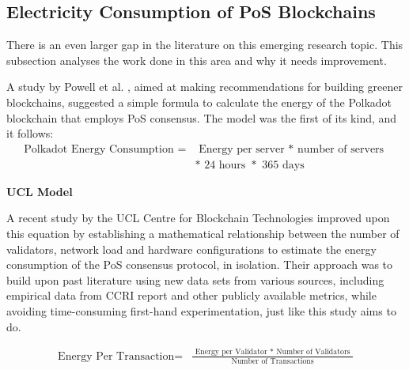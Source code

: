 

\subsection{ Electricity Consumption of PoS Blockchains }
\label{LitRevExistingModels}

There is an even larger gap in the literature on this emerging research topic. This subsection analyses the work done in this area and why it needs improvement.

A study by Powell et al. \cite{Powell2021AWARENESSBLOCKCHAIN}, aimed at making recommendations for building greener blockchains, suggested a simple formula to calculate the energy of the Polkadot blockchain that employs PoS consensus. The model was the first of its kind, and it follows: 
\begin{align}
   \boldsymbol{\mathrm{\text{Polkadot Energy Consumption } = }}
   &\boldsymbol{\mathrm{\text{ Energy per server }* \text{ number of servers } } } \nonumber\\
   &\boldsymbol{\mathrm{* \text{ 24 hours } *\text{ 365 days }}} \nonumber
\end{align}

\textbf{UCL Model } 

A recent study by the UCL Centre for Blockchain Technologies \cite{PlattDiscussionProof-of-Work} improved upon this equation by establishing a mathematical relationship between the number of validators, network load and hardware configurations to estimate the energy consumption of the PoS consensus protocol, in isolation. Their approach was to build upon past literature using new data sets from various sources, including empirical data from CCRI report \cite{CryptoCarbonRatingsInstitute2022TheNetwork} and other publicly available metrics, while avoiding time-consuming first-hand experimentation, just like this study aims to do. 

\begin{align}
   \boldsymbol{\mathrm{\text{Energy Per Transaction} = }}
   &\boldsymbol{\mathrm{\frac{\text{ Energy per Validator }* \text{ Number of Validators } }{\text{ Number of Transactions }}} } \nonumber\\ \nonumber
\end{align}

